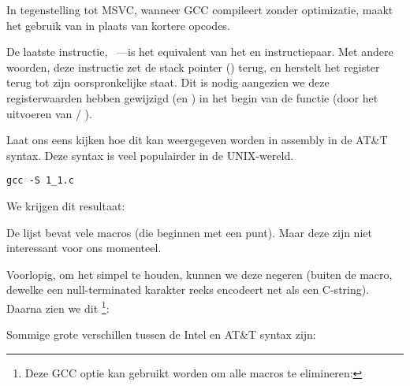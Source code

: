 \NLph{}

In tegenstelling tot MSVC, wanneer GCC compileert zonder optimizatie, maakt het gebruik van  in plaats van kortere opcodes.

De laatste instructie, \LEAVE~---is het equivalent van het  en  instructiepaar.
Met andere woorden, deze instructie zet de \gls{stack pointer} (\ESP) terug, en herstelt het \EBP register
terug tot zijn oorspronkelijke staat.
Dit is nodig aangezien we deze registerwaarden hebben gewijzigd (\ESP en \EBP) in het begin van de functie (door het uitvoeren van  / ).

\label{ATT_syntax}

Laat ons eens kijken hoe dit kan weergegeven worden in assembly in de AT\&T syntax.
Deze syntax is veel populairder in de UNIX-wereld.

\begin{lstlisting}[caption=\NLph{} GCC 4.7.3]
gcc -S 1_1.c
\end{lstlisting}

We krijgen dit resultaat:



De lijst bevat vele macros (die beginnen met een punt). Maar deze zijn niet interessant voor ons momenteel.

Voorlopig, om het simpel te houden, kunnen we deze negeren (buiten de  macro, dewelke
een null-terminated karakter reeks encodeert net als een C-string). Daarna zien we dit
\footnote{Deze GCC optie kan gebruikt worden om alle  macros te elimineren: }:



\myindex{\ATTSyntax}
\myindex{\IntelSyntax}
Sommige grote verschillen tussen de Intel en AT\&T syntax zijn:

